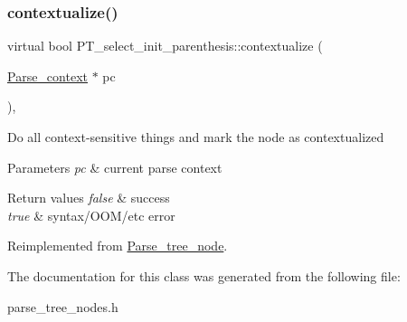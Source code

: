 \subsubsection{\texorpdfstring{contextualize()}{contextualize()}}
{\footnotesize\ttfamily virtual bool P\+T\+\_\+select\+\_\+init\+\_\+parenthesis\+::contextualize (\begin{DoxyParamCaption}\item[{\mbox{\hyperlink{structParse__context}{Parse\+\_\+context}} $\ast$}]{pc }\end{DoxyParamCaption})\hspace{0.3cm}{\ttfamily [inline]}, {\ttfamily [virtual]}}

Do all context-\/sensitive things and mark the node as contextualized


\begin{DoxyParams}{Parameters}
{\em pc} & current parse context\\
\hline
\end{DoxyParams}

\begin{DoxyRetVals}{Return values}
{\em false} & success \\
\hline
{\em true} & syntax/\+O\+O\+M/etc error \\
\hline
\end{DoxyRetVals}


Reimplemented from \mbox{\hyperlink{classParse__tree__node_a22d93524a537d0df652d7efa144f23da}{Parse\+\_\+tree\+\_\+node}}.



The documentation for this class was generated from the following file\+:\begin{DoxyCompactItemize}
\item 
parse\+\_\+tree\+\_\+nodes.\+h\end{DoxyCompactItemize}
